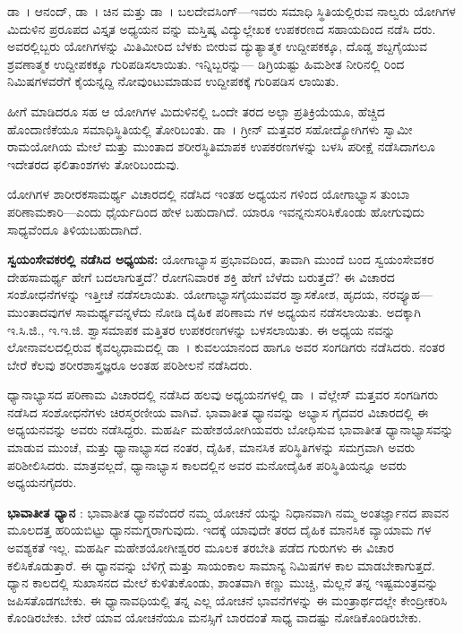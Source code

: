 ಡಾ~। ಆನಂದ್, ಡಾ~। ಚಿನ ಮತ್ತು ಡಾ~। ಬಲದೇವಸಿಂಗ್​—ಇವರು ಸಮಾಧಿ ಸ್ಥಿತಿಯಲ್ಲಿರುವ ನಾಲ್ವರು ಯೋಗಿಗಳ ಮಿದುಳಿನ ಪ್ರರೂಪದ ವಿಸ್ತೃತ ಅಧ್ಯಯನ ವನ್ನು ಮಸ್ತಿಷ್ಕ ವಿದ್ಯುಲ್ಲೇಖಕ  ಉಪಕರಣದ ಸಹಾಯದಿಂದ ನಡೆಸಿ ದರು. ಅವರಲ್ಲಿಬ್ಬರು ಯೋಗಿಗಳನ್ನು ಮಿತಿಮೀರಿದ ಬೆಳಕು ಬೀರುವ ದ್ಯುತ್ಯಾತ್ಮಕ ಉದ್ದೀಪಕಕ್ಕೂ, ದೊಡ್ಡ ಶಬ್ದಗೈಯುವ ಶ್ರವಣಾತ್ಮಕ ಉದ್ದೀಪಕಕ್ಕೂ ಗುರಿಪಡಿಸಲಾಯಿತು. ಇನ್ನಿಬ್ಬರನ್ನು—  ಡಿಗ್ರಿಯಷ್ಟು ಹಿಮಶೀತ ನೀರಿನಲ್ಲಿ  ರಿಂದ  ನಿಮಿಷಗಳವರೆಗೆ ಕೈಯನ್ನದ್ದಿ ನೋವುಂಟುಮಾಡುವ ಉದ್ದೀಪಕಕ್ಕೆ ಗುರಿಪಡಿಸ ಲಾಯಿತು.

ಹೀಗೆ ಮಾಡಿದರೂ ಸಹ ಆ ಯೋಗಿಗಳ ಮಿದುಳಿನಲ್ಲಿ ಒಂದೇ ತರದ ಅಲ್ಫಾ ಪ್ರತಿಕ್ರಿಯೆಯೂ, ಹೆಚ್ಚಿದ ಹೊಂದಾಣಿಕೆಯೂ  ಸಮಾಧಿಸ್ಥಿತಿಯಲ್ಲಿ ತೋರಿಬಂತು. ಡಾ~। ಗ್ರೀನ್ ಮತ್ತವರ ಸಹೋದ್ಯೋಗಿಗಳು ಸ್ವಾಮೀ ರಾಮಯೋಗಿಯ ಮೇಲೆ  ಮತ್ತು  ಮುಂತಾದ ಶರೀರಸ್ಥಿತಿಮಾಪಕ ಉಪಕರಣಗಳನ್ನು ಬಳಸಿ ಪರೀಕ್ಷೆ ನಡೆಸಿದಾಗಲೂ ಇದೇತರದ ಫಲಿತಾಂಶಗಳು ತೋರಿಬಂದುವು.

ಯೋಗಿಗಳ ಶಾರೀರಕಸಾಮರ್ಥ್ಯ ವಿಚಾರದಲ್ಲಿ ನಡೆಸಿದ ಇಂತಹ ಅಧ್ಯಯನ ಗಳಿಂದ ಯೋಗಾಭ್ಯಾಸ ತುಂಬಾ ಪರಿಣಾಮಕಾರಿ—ಎಂದು ಧೈರ್ಯದಿಂದ ಹೇಳ ಬಹುದಾಗಿದೆ. ಯಾರೂ ಇವನ್ನನುಸರಿಸಿಕೊಂಡು ಹೋಗುವುದು ಸಾಧ್ಯವೆಂದೂ ತಿಳಿಯಬಹುದಾಗಿದೆ.

\textbf{ಸ್ವಯಂಸೇವಕರಲ್ಲಿ ನಡೆಸಿದ ಅಧ್ಯಯನ:} ಯೋಗಾಭ್ಯಾಸ ಪ್ರಭಾವದಿಂದ, ತಾವಾಗಿ ಮುಂದೆ ಬಂದ ಸ್ವಯಂಸೇವಕರ ದೇಹಸಾಮರ್ಥ್ಯ ಹೇಗೆ ಬದಲಾಗುತ್ತದೆ? ರೋಗನಿವಾರಕ ಶಕ್ತಿ ಹೇಗೆ ಬೆಳೆದು ಬರುತ್ತದೆ? ಈ ವಿಚಾರದ ಸಂಶೋಧನೆಗಳನ್ನು ಇತ್ತೀಚೆ ನಡೆಸಲಾಯಿತು. ಯೋಗಾಭ್ಯಾಸಗೈಯುವವರ ಶ್ವಾಸಕೋಶ, ಹೃದಯ, ನರವ್ಯೂಹ—ಮುಂತಾದವುಗಳ ಸಾಮರ್ಥ್ಯವನ್ನಳೆದು ನೋಡಿ ದೈಹಿಕ ಪರಿಣಾಮ ಗಳ ಅಧ್ಯಯನ ನಡೆಸಲಾಯಿತು. ಅದಕ್ಕಾಗಿ ಇ.ಸಿ.ಜಿ., ಇ.ಇ.ಜಿ. ಶ್ವಾಸಮಾಪಕ  ಮತ್ತಿತರ ಉಪಕರಣಗಳನ್ನು ಬಳಸಲಾಯಿತು. ಈ ಅಧ್ಯಯ ನವನ್ನು ಲೋನಾವಲದಲ್ಲಿರುವ ಕೈವಲ್ಯಧಾಮದಲ್ಲಿ ಡಾ~। ಕುವಲಯಾನಂದ ಹಾಗೂ ಅವರ ಸಂಗಡಿಗರು ನಡೆಸಿದರು. ನಂತರ ಬೇರೆ ಕೆಲವು ಶರೀರಶಾಸ್ತ್ರಜ್ಞರೂ ಅಂತಹ ಪರಿಶೀಲನೆ ನಡೆಸಿದರು.

ಧ್ಯಾನಾಭ್ಯಾಸದ ಪರಿಣಾಮ ವಿಚಾರದಲ್ಲಿ ನಡೆಸಿದ ಹಲವು ಅಧ್ಯಯನಗಳಲ್ಲಿ ಡಾ~। ವೆಲ್ಲೇಸ್ ಮತ್ತವರ ಸಂಗಡಿಗರು ನಡೆಸಿದ ಸಂಶೋಧನೆಗಳು ಚಿರಸ್ಮರಣೀಯ ವಾಗಿವೆ. ಭಾವಾತೀತ ಧ್ಯಾನವನ್ನು  ಅಭ್ಯಾಸ ಗೈದವರ ವಿಚಾರದಲ್ಲಿ ಈ ಅಧ್ಯಯನವನ್ನು ಅವರು ನಡೆಸಿದ್ದರು. ಮಹರ್ಷಿ ಮಹೇಶಯೋಗಿಯವರು ಬೋಧಿಸುವ ಭಾವಾತೀತ ಧ್ಯಾನಾಭ್ಯಾಸವನ್ನು ಮಾಡುವ ಮುಂಚೆ, ಮತ್ತು ಧ್ಯಾನಾಭ್ಯಾಸದ ನಂತರ, ದೈಹಿಕ, ಮಾನಸಿಕ ಪರಿಸ್ಥಿತಿಗಳನ್ನು ಸಮಗ್ರವಾಗಿ ಅವರು ಪರಿಶೀಲಿಸಿದರು. ಮಾತ್ರವಲ್ಲದೆ, ಧ್ಯಾನಾಭ್ಯಾಸ ಕಾಲದಲ್ಲಿನ ಅವರ ಮನೋದೈಹಿಕ ಪರಿಸ್ಥಿತಿಯನ್ನೂ ಅವರು ಅಧ್ಯಯನಗೈದರು.

\textbf{ಭಾವಾತೀತ ಧ್ಯಾನ} : ಭಾವಾತೀತ ಧ್ಯಾನವೆಂದರೆ ನಮ್ಮ ಯೋಚನೆ ಯನ್ನು ನಿಧಾನವಾಗಿ ನಮ್ಮ ಅಂತರ್ಜ್ಞಾನದ ಪಾವನ ಮೂಲದತ್ತ ಹರಿಯಬಿಟ್ಟು ಧ್ಯಾನಮಗ್ನರಾಗುವುದು. ಇದಕ್ಕೆ ಯಾವುದೇ ತರದ ದೈಹಿಕ ಮಾನಸಿಕ ವ್ಯಾಯಾಮ ಗಳ ಅವಶ್ಯಕತೆ ಇಲ್ಲ. ಮಹರ್ಷಿ ಮಹೇಶಯೋಗೀಶ್ವರರ ಮೂಲಕ ತರಬೇತಿ ಪಡೆದ ಗುರುಗಳು ಈ ವಿಚಾರ ಕಲಿಸಿಕೊಡುತ್ತಾರೆ. ಈ ಧ್ಯಾನವನ್ನು ಬೆಳಿಗ್ಗೆ ಮತ್ತು ಸಾಯಂಕಾಲ ಸಾಮಾನ್ಯ  ನಿಮಿಷಗಳ ಕಾಲ ಮಾಡಬೇಕಾಗುತ್ತದೆ. ಧ್ಯಾನ ಕಾಲದಲ್ಲಿ ಸುಖಾಸನದ ಮೇಲೆ ಕುಳಿತುಕೊಂಡು, ಶಾಂತವಾಗಿ ಕಣ್ಣು ಮುಚ್ಚಿ, ಮೆಲ್ಲನೆ ತನ್ನ ಇಷ್ಟಮಂತ್ರವನ್ನು ಜಪಿಸತೊಡಗಬೇಕು. ಈ ಧ್ಯಾನಾವಧಿಯಲ್ಲಿ ತನ್ನ ಎಲ್ಲ ಯೋಚನೆ ಭಾವನೆಗಳನ್ನು ಈ ಮಂತ್ರಾರ್ಥದಲ್ಲೇ ಕೇಂದ್ರೀಕರಿಸಿ ಕೊಂಡಿರಬೇಕು. ಬೇರೆ ಯಾವ ಯೋಚನೆಯೂ ಮನಸ್ಸಿಗೆ ಬಾರದಂತೆ ಸಾಧ್ಯ ವಾದಷ್ಟು ನೋಡಿಕೊಂಡಿರಬೇಕು.

